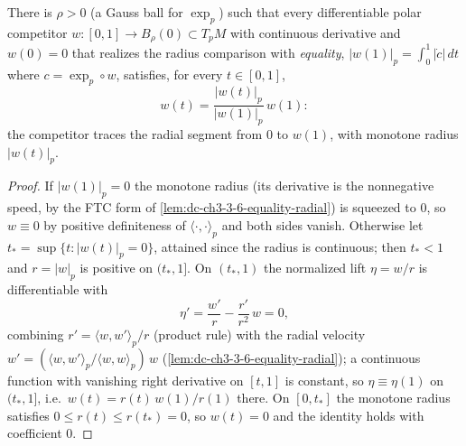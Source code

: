 \begin{lemma}
  \label{lem:dc-ch3-3-6-equality-ray}


  There is $\rho>0$ (a Gauss ball for $\exp_p$) such that every
  differentiable polar competitor $w:[0,1]\to B_\rho(0)\subset T_pM$ with
  continuous derivative and $w(0)=0$ that realizes the radius comparison with
  \emph{equality}, $|w(1)|_p=\int_0^1|\dot c|\,dt$ where $c=\exp_p\circ w$,
  satisfies, for every $t\in[0,1]$,
  $$w(t)=\frac{|w(t)|_p}{|w(1)|_p}\,w(1):$$
  the competitor traces the radial segment from $0$ to $w(1)$, with monotone
  radius $|w(t)|_p$.
\end{lemma}
\begin{proof}
  \sketch

  If $|w(1)|_p=0$ the monotone radius (its derivative is the nonnegative
  speed, by the FTC form of \cref{lem:dc-ch3-3-6-equality-radial}) is
  squeezed to $0$, so $w\equiv0$ by positive definiteness of
  $\langle\cdot,\cdot\rangle_p$ and both sides vanish. Otherwise let
  $t_*=\sup\{t:|w(t)|_p=0\}$, attained since the radius is continuous; then
  $t_*<1$ and $r=|w|_p$ is positive on $(t_*,1]$. On $(t_*,1)$ the
  normalized lift $\eta=w/r$ is differentiable with
  $$\eta'=\frac{w'}{r}-\frac{r'}{r^2}\,w=0,$$
  combining $r'=\langle w,w'\rangle_p/r$ (product rule) with the radial
  velocity $w'=(\langle w,w'\rangle_p/\langle w,w\rangle_p)\,w$
  (\cref{lem:dc-ch3-3-6-equality-radial}); a continuous function with
  vanishing right derivative on $[t,1]$ is constant, so $\eta\equiv\eta(1)$
  on $(t_*,1]$, i.e.\ $w(t)=r(t)\,w(1)/r(1)$ there. On $[0,t_*]$ the
  monotone radius satisfies $0\le r(t)\le r(t_*)=0$, so $w(t)=0$ and the
  identity holds with coefficient $0$.
\end{proof}

